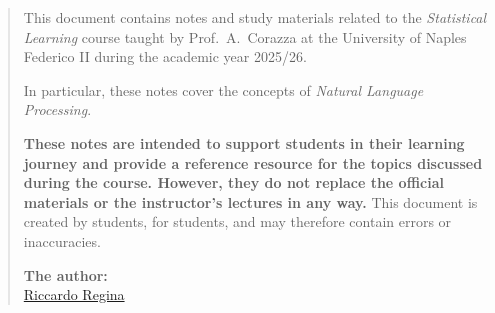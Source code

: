 \begin{abstract}
  This document contains notes and study materials related to the \textit{Statistical Learning} course taught by Prof.~A.~Corazza at the University of Naples Federico II during the academic year 2025/26.

  In particular, these notes cover the concepts of \textit{Natural Language Processing}.

  \textbf{These notes are intended to support students in their learning journey and provide a reference resource for the topics discussed during the course. However, they do not replace the official materials or the instructor's lectures in any way.}
  This document is created by students, for students, and may therefore contain errors or inaccuracies.

  \begin{flushright}
    \vspace{2cm}
    \textbf{The author:}\\
    \href{https://github.com/riccardoregina}{Riccardo Regina} \\
  \end{flushright}
\end{abstract}